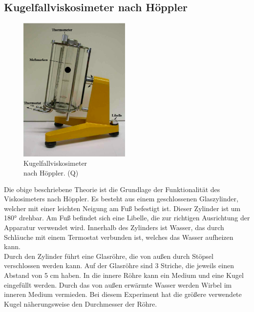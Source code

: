         \subsection{Kugelfallviskosimeter nach Höppler}
            \begin{figure}
                \begin{center}
                    \includegraphics[width=5.5cm]{content/Viskosimeter.png}
                    \caption[width=5.5cm]{Kugelfallviskosimeter\\nach Höppler. (Q\cite{anleitungV207})}
                \end{center}
                
                \label{fig:Kugelfallviskosimeter}
            \end{figure}
            Die obige beschriebene Theorie ist die Grundlage der Funktionalität des Viskosimeters 
            nach Höppler. Es besteht aus einem geschlossenen Glaszylinder, 
            welcher mit einer leichten Neigung am Fuß befestigt
            ist. Dieser Zylinder ist um 180° drehbar. Am Fuß befindet sich eine Libelle, die zur 
            richtigen Ausrichtung der Apparatur verwendet wird. 
            Innerhalb des Zylinders ist Wasser, das durch Schläuche mit einem Termostat verbunden ist,
            welches das Wasser aufheizen kann. \\
            Durch den Zylinder führt eine Glasröhre, die von außen durch Stöpsel 
            verschlossen werden kann. Auf der Glasröhre sind 3 Striche, die jeweils 
            einen Abstand von 5 \unit{\centi\meter} haben. In die innere Röhre kann
            ein Medium und eine Kugel eingefüllt werden. Durch das von außen erwärmte Wasser werden Wirbel im inneren Medium vermieden. 
            Bei diesem Experiment hat die größere verwendete Kugel näherungsweise den Durchmesser der Röhre. 
